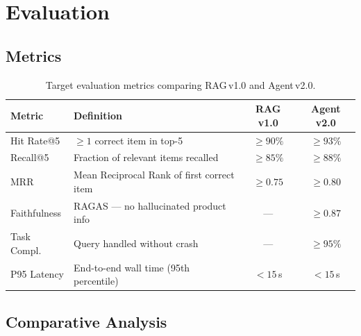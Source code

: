 \documentclass[12pt,a4paper]{article}
\begin{document}
\section{Evaluation}
\label{sec:eval}

\subsection{Metrics}

\begin{table}[H]
\centering
\begin{tabularx}{\linewidth}{lXcc}
\toprule
\textbf{Metric} & \textbf{Definition} & \textbf{RAG v1.0} & \textbf{Agent v2.0} \\
\midrule
Hit Rate@5  & $\geq 1$ correct item in top-5           & $\geq 90\%$ & $\geq 93\%$ \\
Recall@5    & Fraction of relevant items recalled       & $\geq 85\%$ & $\geq 88\%$ \\
MRR         & Mean Reciprocal Rank of first correct item& $\geq 0.75$ & $\geq 0.80$ \\
Faithfulness& RAGAS --- no hallucinated product info      & ---           & $\geq 0.87$ \\
Task Compl. & Query handled without crash               & ---           & $\geq 95\%$ \\
P95 Latency & End-to-end wall time (95th percentile)   & $<15$\,s    & $<15$\,s   \\
\bottomrule
\end{tabularx}
\caption{Target evaluation metrics comparing RAG\,v1.0 and Agent\,v2.0.}
\label{tab:eval}
\end{table}

\subsection{Comparative Analysis}
\end{document}

